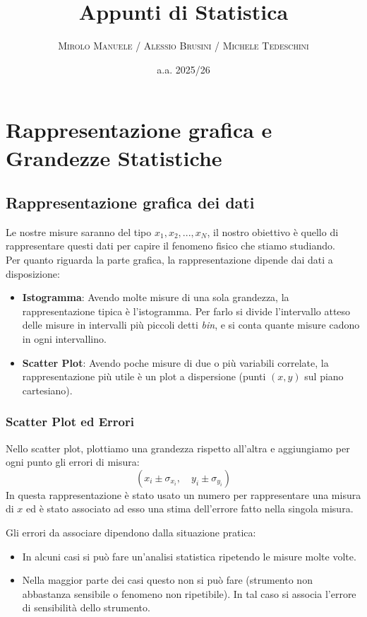 \documentclass[openany,a4paper,12pt]{book}
\title{\textbf{\Huge Appunti di Statistica}}
\author{\textsc{Mirolo Manuele / Alessio Brusini / Michele Tedeschini}}
\date{a.a. 2025/26}
\theoremstyle{remark}
\begin{document}
\pagestyle{empty}

\maketitle

\justifying

\tableofcontents

\newpage
{}
\setcounter{page}{1}
\pagestyle{fancy}



\section{Rappresentazione grafica e Grandezze Statistiche} 
\subsection*{Rappresentazione grafica dei dati}
Le nostre misure saranno del tipo ${x_1, x_2, ..., x_N}$, il nostro obiettivo è quello di rappresentare questi dati per capire il fenomeno fisico
che stiamo studiando.\\
Per quanto riguarda la parte grafica, la rappresentazione dipende dai dati a disposizione:
\begin{itemize}
    \item \textbf{Istogramma}: Avendo molte misure di una sola grandezza, la rappresentazione tipica è l'istogramma. Per farlo si divide l'intervallo atteso delle misure in intervalli più piccoli detti \textit{bin}, e si conta quante misure cadono in ogni intervallino.
    \item \textbf{Scatter Plot}: Avendo poche misure di due o più variabili correlate, la rappresentazione più utile è un plot a dispersione (punti $(x,y)$ sul piano cartesiano).
\end{itemize}

\subsubsection{Scatter Plot ed Errori}
Nello scatter plot, plottiamo una grandezza rispetto all'altra e aggiungiamo per ogni punto gli errori di misura:
\[ (x_i \pm \sigma_{x_i}, \quad y_i \pm \sigma_{y_i}) \]
In questa rappresentazione è stato usato un numero per rappresentare una misura di $x$ ed è stato associato ad esso una stima dell'errore fatto nella singola misura.

Gli errori da associare dipendono dalla situazione pratica:
\begin{itemize}
    \item In alcuni casi si può fare un'analisi statistica ripetendo le misure molte volte.
    \item Nella maggior parte dei casi  questo non si può fare (strumento non abbastanza sensibile o fenomeno non ripetibile). In tal caso si associa l'errore di sensibilità dello strumento.
\end{itemize}
\end{document}
